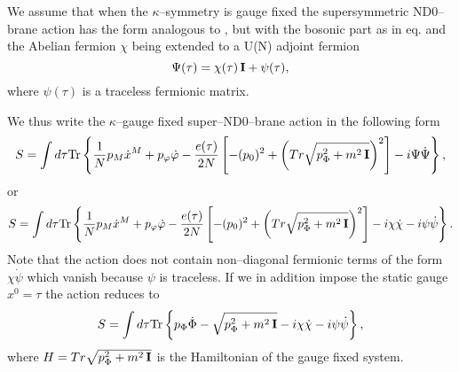 \documentclass[a4paper,12pt]{article}
\begin{document}
We assume that when the $\kappa$--symmetry is gauge fixed the
supersymmetric ND0--brane action has the form analogous to
, but with the bosonic part as in eq.  and the Abelian
fermion $\chi$ being extended to a U(N) adjoint fermion
\begin{equation}\label{27}
\Psi(\tau)=\chi(\tau)\, {\bf I}+\psi(\tau),
\end{equation}
where $\psi(\tau)$ is a traceless fermionic matrix.

 We thus write the $\kappa$--gauge fixed super--ND0--brane action
 in the following form
$$
S=\int d\tau {\rm Tr}\left\{{1\over N}p_M\dot
x^M+p_\varphi\dot\varphi-{{e(\tau)}\over
2N}\left[-(p_0)^2+\left(Tr\sqrt{p_\Phi^2+m^2\,{\bf
I}}\right)^2\right]-i\Psi\dot\Psi \right\},
$$
or
\begin{equation}\label{28}
S=\int d\tau {\rm Tr}\left\{{1\over N}p_M\dot
x^M+p_\varphi\dot\varphi-{{e(\tau)}\over
2N}\left[-(p_0)^2+\left(Tr\sqrt{p_\Phi^2+m^2\,{\bf
I}}\right)^2\right]-i\chi\dot\chi-i\psi\dot\psi \right\}.
\end{equation}
Note that the action  does not contain non--diagonal
fermionic terms of the form $\chi\dot\psi$ which vanish because
$\psi$ is traceless. If we in addition impose the static gauge
$x^0=\tau$ the action reduces to
\begin{equation}\label{static}
S=\int d\tau {\rm Tr}\left\{p_\Phi\dot\Phi-
\sqrt{p_\Phi^2+m^2\,{\bf I}}-i\chi\dot\chi-i\psi\dot\psi \right\},
\end{equation}
where $H=Tr\sqrt{p_\Phi^2+m^2\,{\bf I}}$ is the Hamiltonian of the
gauge fixed system.
\end{document}
